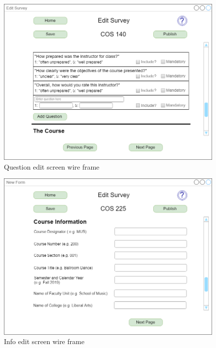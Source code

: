 \documentclass{article}
\begin{document}
\begin{center}
\begin{figure}
    \centering
    \includegraphics[scale=.3]{images/question_edit_screen.png}
    \caption{Question edit screen wire frame}
    \label{fig:my_label}
\end{figure}
\end{center}

\begin{center}
\begin{figure}
    \centering
    \includegraphics[scale=.3]{images/info_edit_screen.png}
    \caption{Info edit screen wire frame}
    \label{fig:my_label}
\end{figure}
\end{center}
\end{document}

